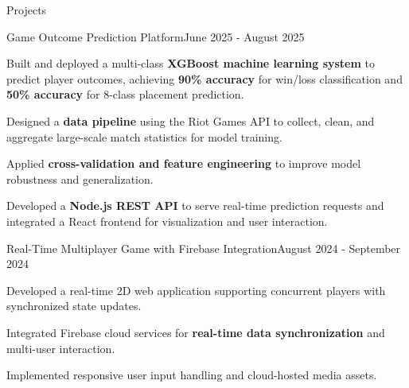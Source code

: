 \documentclass{resume} %
\begin{document}
\begin{rSection}{Projects}

\begin{rSubsection}{Game Outcome Prediction Platform}{June 2025 - August 2025}{}{}
\item \textmd{Built and deployed a multi-class \textbf{XGBoost machine learning system} to predict player outcomes, achieving \textbf{90\% accuracy} for win/loss classification and \textbf{50\% accuracy} for 8-class placement prediction.}
\item \textmd{Designed a \textbf{data pipeline} using the Riot Games API to collect, clean, and aggregate large-scale match statistics for model training.}
\item \textmd{Applied \textbf{cross-validation and feature engineering} to improve model robustness and generalization.}
\item \textmd{Developed a \textbf{Node.js REST API} to serve real-time prediction requests and integrated a React frontend for visualization and user interaction.}
\end{rSubsection}

\begin{rSubsection}{Real-Time Multiplayer Game with Firebase Integration}{August 2024 - September 2024}{}{}
\item \textmd{Developed a real-time 2D web application supporting concurrent players with synchronized state updates.}
\item \textmd{Integrated Firebase cloud services for \textbf{real-time data synchronization} and multi-user interaction.}
\item \textmd{Implemented responsive user input handling and cloud-hosted media assets.}
\end{rSubsection}

\end{rSection}





\end{document}
